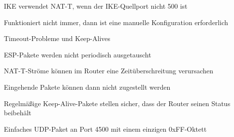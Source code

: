 \documentclass[a4paper]{article}
\begin{document}
\begin{multicols}{3}
\begin{itemize*}
\begin{itemize*}
                  \item IKE verwendet NAT-T, wenn der IKE-Quellport nicht 500 ist
                  \item Funktioniert nicht immer, dann ist eine manuelle Konfiguration erforderlich
            \end{itemize*}
            \item Timeout-Probleme und Keep-Alives
            \begin{itemize*}
                  \item ESP-Pakete werden nicht periodisch ausgetauscht
                  \item NAT-T-Ströme können im Router eine Zeitüberschreitung verursachen
                  \item Eingehende Pakete können dann nicht zugestellt werden
                  \item Regelmäßige Keep-Alive-Pakete stellen sicher, dass der Router seinen Status beibehält
                  \item Einfaches UDP-Paket an Port 4500 mit einem einzigen 0xFF-Oktett
            \end{itemize*}
      \end{itemize*}


\end{multicols}
\end{document}
